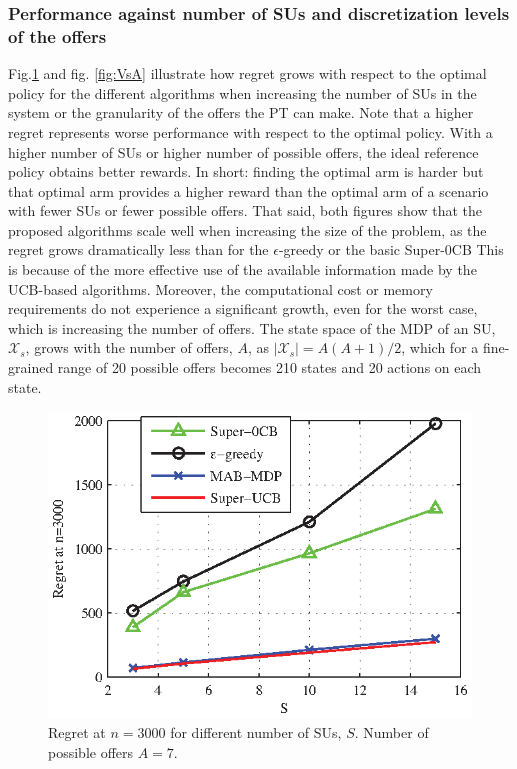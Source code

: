 \subsubsection{Performance against number of SUs and discretization levels of the offers}

Fig.\ref{fig:VsN} and fig. \ref{fig:VsA} illustrate how regret grows with respect to the optimal policy for the different algorithms when increasing the number of SUs in the system or the granularity of the offers the PT can make.
Note that a higher regret represents worse performance with respect to the optimal policy.
With a higher number of SUs or higher number of possible offers, the ideal reference policy obtains better rewards. 
In short: finding the optimal arm is harder but that optimal arm provides a higher reward than the optimal arm of a scenario with fewer SUs or fewer possible offers. 
That said, both figures show that the proposed algorithms scale well when increasing the size of the problem, as the regret grows dramatically less than for the $\epsilon$-greedy or the basic Super-0CB  
This is because of the more effective use of the available information made by the UCB-based algorithms. 
Moreover, the computational cost or memory requirements do not experience a significant growth, even for the worst case, which is increasing the number of offers. 
The state space of the MDP of an SU, $\mathcal{X}_s$, grows with the number of offers, $A$, as $|\mathcal{X}_s| = A(A+1)/2$, which for a fine-grained range of 20 possible offers becomes 210 states and 20 actions on each state. 
\begin{figure}[!t]
\centering
\includegraphics{VsN.eps}
\caption{Regret at $n = 3000$ for different number of SUs, $S$. Number of possible offers $A = 7$.}
\label{fig:VsN}
\end{figure}

